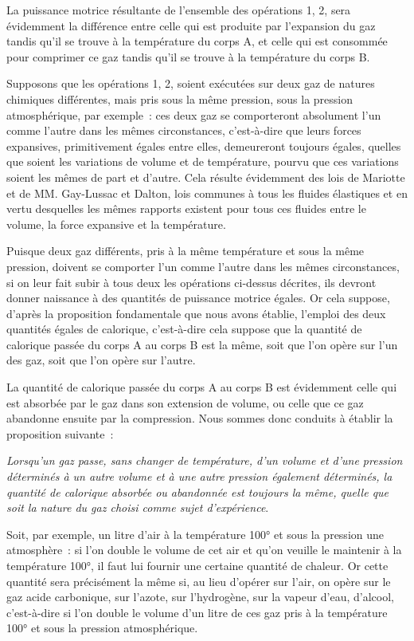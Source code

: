 \documentclass[french,twoside]{book} %
\begin{document}
\noindent La puissance motrice résultante de l’ensemble des opérations 1, 2, sera évidemment la différence entre celle qui est produite par l’expansion du gaz tandis qu’il se trouve à la température du corps A, et celle qui est consommée pour comprimer ce gaz tandis qu’il se trouve à la température du corps B.\par
Supposons que les opérations 1, 2, soient exécutées sur deux gaz de natures chimiques différentes, mais pris sous la même pression, sous la pression atmosphérique, par exemple : ces deux gaz se comporteront absolument l’un comme l’autre dans les mêmes circonstances, c’est-à-dire que leurs forces expansives, primitivement égales entre elles, demeureront toujours égales, quelles que soient les variations de volume et de température, pourvu que ces variations soient les mêmes de part et d’autre. Cela résulte évidemment des lois de Mariotte et de MM. Gay-Lussac et Dalton, lois communes à tous les fluides élastiques et en vertu desquelles les mêmes rapports existent pour tous ces fluides entre le volume, la force expansive et la température.\par
Puisque deux gaz différents, pris à la même température et sous la même pression, doivent se comporter l’un comme l’autre dans les mêmes circonstances, si on leur fait subir à tous deux les opérations ci-dessus décrites, ils devront donner naissance à des quantités de puissance motrice égales. Or cela suppose, d’après la proposition fondamentale que nous avons établie, l’emploi des deux quantités égales de calorique, c’est-à-dire cela suppose que la quantité de calorique passée du corps A au corps B est la même, soit que l’on opère sur l’un des gaz, soit que l’on opère sur l’autre.\par
La quantité de calorique passée du corps A au corps B est évidemment celle qui est absorbée par le gaz dans son extension de volume, ou celle que ce gaz abandonne ensuite par la compression. Nous sommes donc conduits à établir la proposition suivante :\par
\emph{Lorsqu’un gaz passe, sans changer de température, d’un volume et d’une pression déterminés à un autre volume et à une autre pression également déterminés, la quantité de calorique absorbée ou abandonnée est toujours la même, quelle que soit la nature du gaz choisi comme sujet d’expérience}.\par
Soit, par exemple, un litre d’air à la température 100° et sous la pression une atmosphère : si l’on double le volume de cet air et qu’on veuille le maintenir à la température 100°, il faut lui fournir une certaine quantité de chaleur. Or cette quantité sera précisément la même si, au lieu d’opérer sur l’air, on opère sur le gaz acide carbonique, sur l’azote, sur l’hydrogène, sur la vapeur d’eau, d’alcool, c’est-à-dire si l’on double le volume d’un litre de ces gaz pris à la température 100° et sous la pression atmosphérique.\par
\end{document}
